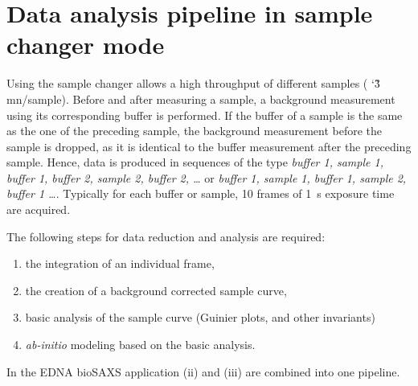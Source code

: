 \documentclass[preprint,pdf]{iucr}              %
\begin{document}
\section{Data analysis pipeline in sample changer mode}

Using the sample changer allows a high throughput of different samples (
\char`\~3 mn/sample).  
Before and after measuring a sample, a background measurement using its
corresponding buffer is performed.
If the buffer of a sample is the same as the one of the preceding sample, the
background measurement before the sample is dropped, as it is identical to the
buffer measurement after the preceding sample.
Hence, data is produced in sequences of the type \textit{buffer 1, sample 1,
buffer 1, buffer 2, sample 2, buffer 2, \ldots}  or  \textit{buffer 1, sample 1,
buffer 1,  sample 2, buffer 1 \ldots}.
Typically for each buffer or sample, 10 frames of 1~s exposure time are acquired.

The following steps for data reduction and analysis are required:
\begin{enumerate}
\item the integration of an individual frame,
\item the creation of a background corrected sample curve,
\item basic analysis of the sample curve (Guinier plots, and other invariants)
\item \textit{ab-initio} modeling based on the basic analysis.
\end{enumerate}
In the EDNA bioSAXS application (ii) and (iii) are combined into one pipeline.
\end{document}
